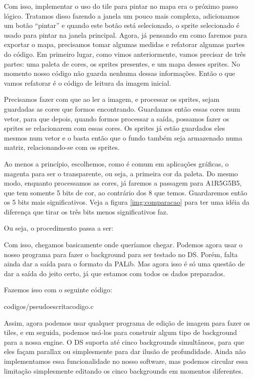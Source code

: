 \documentclass[brazil]{abnt}
\begin{document}
Com isso, implementar o uso do tile para pintar no mapa era o próximo passo lógico. Tratamos disso fazendo a janela um pouco mais complexa, adicionamos um botão ``pintar'' e quando este botão está selecionado, o sprite selecionado é usado para pintar na janela principal. Agora, já pensando em como faremos para exportar o mapa, precisamos tomar algumas medidas e refatorar algumas partes do código. Em primeiro lugar, como vimos anteriormente, vamos precisar de três partes: uma paleta de cores, os sprites presentes, e um mapa desses sprites. No momento nosso código não guarda nenhuma dessas informações. Então o que vamos refatorar é o código de leitura da imagem inicial.

Precisamos fazer com que ao ler a imagem, e processar os sprites, sejam guardadas as cores que formos encontrando. Guardamos então essas cores num vetor, para que depois, quando formos processar a saída, possamos fazer os sprites se relacionarem com essas cores. Os sprites já estão guardados eles mesmos num vetor e o basta então que o fundo também seja armazenado numa matriz, relacionando-se com os sprites.

Ao menos a princípio, escolhemos, como é comum em aplicações gráficas, o magenta para ser o transparente, ou seja, a primeira cor da paleta. Do mesmo modo, enquanto processamos as cores, já faremos a passagem para A1R5G5B5, que tem somente 5 bits de cor, ao contrário dos 8 que temos. Guardaremos então os 5 bits mais significativos. Veja a figura \ref{img:comparacao} para ter uma idéia da diferença que tirar os três bits menos significativos faz.

Ou seja, o procedimento passa a ser:



Com isso, chegamos basicamente onde queríamos chegar. Podemos agora usar o nosso programa para fazer o background para ser testado no DS. Porém, falta ainda dar a saída para o formato da PALib. Mas agora isso é só uma questão de dar a saída do jeito certo, já que estamos com todos os dados preparados.

Fazemos isso com o seguinte código:


{codigos/pseudoescritacodigo.c}

Assim, agora podemos usar qualquer programa de edição de imagem para fazer os tiles, e em seguida, podemos usá-los para construir algum tipo de background para a nossa engine. O DS suporta até cinco backgrounds simultâneos, para que eles façam parallax ou simplesmente para dar ilusão de profundidade. Ainda não implementamos essa funcionalidade no nosso software, mas podemos circular essa limitação simplesmente editando os cinco backgrounds em momentos diferentes.
\end{document}
